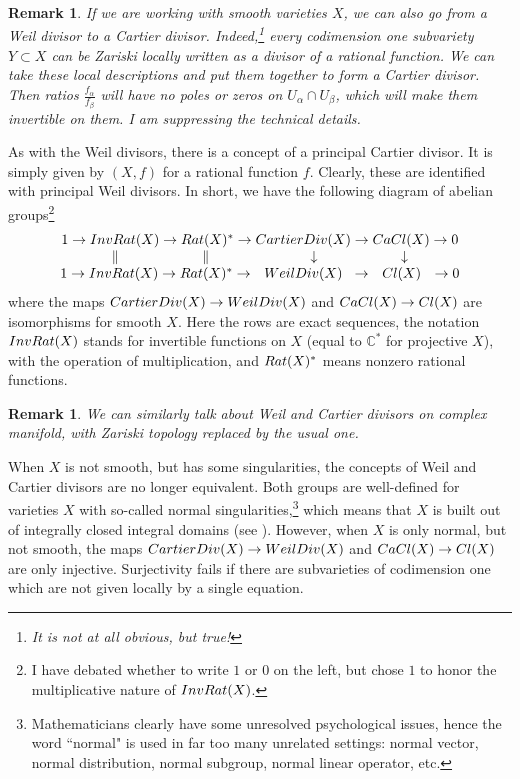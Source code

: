 \documentclass[11pt]{article}
\numberwithin{equation}{section}
\numberwithin{footnote}{section}
\newtheorem{rem}[thm]{Remark}
\newcommand{\blue}{\color{blue}}
\newcommand{\red}{\color{red}}
\newcommand{\C}{{\mathbb C}}
\begin{document}
\smallskip
\begin{rem}
If we are working with {\red smooth} varieties $X$,
we can also go from a Weil divisor to a Cartier divisor. Indeed,\footnote{ It is not at all obvious, but true!} every codimension one subvariety $Y\subset X$ can be Zariski locally written as a divisor of a rational function. We can take these local descriptions and put them together to form a Cartier divisor. Then ratios $\frac {f_\alpha }{f_\beta}$ will have no poles or zeros on $U_\alpha\cap U_\beta$, which will make them invertible on them. I am suppressing the technical details.
\end{rem}

\smallskip
As with the Weil divisors, there is a concept of a principal Cartier divisor. It is simply given by $(X,f)$ for a rational function $f$. Clearly, these are identified with principal Weil divisors. In short, we have the following diagram of abelian groups\footnote{ I have debated whether to write $1$ or $0$ on the left, but chose $1$ to honor the multiplicative nature of $ {\rm InvRat}(X) $.}
\begin{equation}\label{CaWe}
\begin{array}{c}
1 \to {\rm InvRat}(X) \to {\rm Rat}(X)^* \to  {\rm CartierDiv}(X) \to {\rm CaCl}(X)\to  0\\
      \Arrowvert  \hskip 60pt  \Arrowvert     \hskip 70pt  \downarrow   \hskip 60pt   \downarrow  \\
1  \to  {\rm InvRat}(X)  \to  {\rm Rat}(X)^*  \to \hskip 7pt {\rm WeilDiv}(X)\hskip 6pt \to \hskip 7pt{\rm Cl}(X) \hskip 7pt\to 0
\end{array}
\end{equation}
where the maps $ {\rm CartierDiv}(X)\to {\rm WeilDiv}(X)$ and ${\rm CaCl}(X)\to {\rm Cl(X)}$ are isomorphisms for smooth $X$. Here the rows are exact sequences, the notation  ${\rm InvRat}(X)$ stands for invertible functions on $X$ (equal to $\C^*$ for projective $X$), with the operation of multiplication, and $ {\rm Rat}(X)^* $ means nonzero rational functions.


\smallskip
\begin{rem}
We can similarly talk about Weil and Cartier divisors on complex manifold, with Zariski topology replaced by the usual one.
\end{rem}

\smallskip
When $X$ is not smooth, but has some singularities, the concepts of Weil and Cartier divisors are no longer equivalent. 
Both groups are well-defined for varieties $X$ with so-called normal 
singularities,\footnote{ Mathematicians clearly have some unresolved psychological issues, hence the word ``normal" is used in far too many unrelated settings: normal vector, normal distribution, normal subgroup, normal linear operator, etc.}  which means that $X$ is built out of integrally closed integral domains (see \cite{AM}). However, when $X$ is only normal, but not smooth, the maps $ {\rm CartierDiv}(X)\to {\rm WeilDiv}(X)$ and ${\rm CaCl}(X)\to {\rm Cl(X)}$ are only injective. Surjectivity fails if there are subvarieties of codimension one which are {\blue not given locally by a single equation}. 
\end{document}

